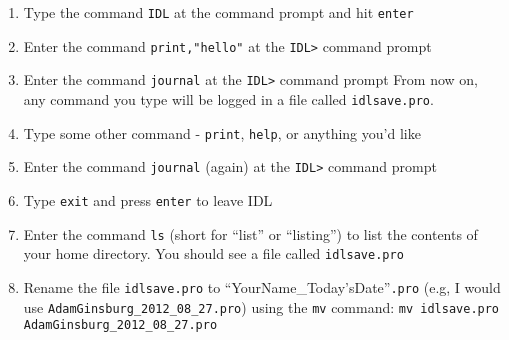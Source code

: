 \documentclass{article}
\begin{document}
\begin{spacing}{1.0}
\begin{enumerate}
    \item Type the command \verb|IDL| at the command prompt and hit \verb|enter|
    \item Enter the command \verb|print,"hello"| at the \verb|IDL>| command prompt
    \item Enter the command \verb|journal| at the \verb|IDL>| command prompt
        From now on, any command you type will be logged in a file called \verb|idlsave.pro|.
    \item Type some other command - \verb|print|, \verb|help|, or anything you'd like
    \item Enter the command \verb|journal| (again) at the \verb|IDL>| command prompt
    \item Type \verb|exit| and press \verb|enter| to leave IDL
    \item Enter the command \verb|ls| (short for ``list'' or ``listing'') to list the contents
        of your home directory.  You should see a file called \verb|idlsave.pro|
    \item Rename the file \verb|idlsave.pro| to ``YourName\_Today'sDate''\verb|.pro| (e.g, 
        I would use \verb|AdamGinsburg_2012_08_27.pro|) using the \verb|mv| command:
        \verb|mv idlsave.pro AdamGinsburg_2012_08_27.pro|

\end{enumerate}


\end{spacing}
\end{document}

